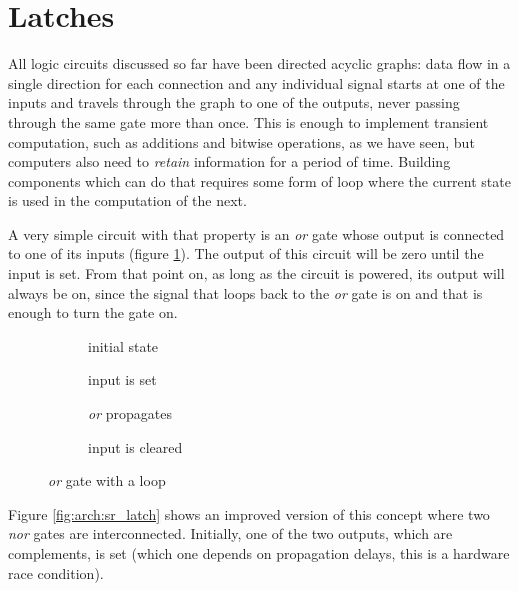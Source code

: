 \section{Latches}

All logic circuits discussed so far have been directed acyclic graphs: data flow
in a single direction for each connection and any individual signal starts at
one of the inputs and travels through the graph to one of the outputs, never
passing through the same gate more than once.  This is enough to implement
transient computation, such as additions and bitwise operations, as we have
seen, but computers also need to \emph{retain} information for a period of time.
Building components which can do that requires some form of loop where the
current state is used in the computation of the next.

A very simple circuit with that property is an \textit{or} gate whose output is
connected to one of its inputs (figure \ref{fig:arch:or_loop}).  The output of
this circuit will be zero until the input is set.  From that point on, as long
as the circuit is powered, its output will always be on, since the signal that
loops back to the \textit{or} gate is on and that is enough to turn the gate on.

\begin{figure}[p]
    \centering
    \begin{subfigure}{0.24\textwidth}
        
        \caption{initial state}
    \end{subfigure}
    \begin{subfigure}{0.24\textwidth}
        
        \caption{input is set}
    \end{subfigure}
    \begin{subfigure}{0.24\textwidth}
        
        \caption{\textit{or} propagates}
    \end{subfigure}
    \begin{subfigure}{0.24\textwidth}
        
        \caption{input is cleared}
    \end{subfigure}
    \caption{\textit{or} gate with a loop}
    \label{fig:arch:or_loop}
\end{figure}

Figure \ref{fig:arch:sr_latch} shows an improved version of this concept where
two \textit{nor} gates are interconnected.  Initially, one of the two outputs,
which are complements, is set (which one depends on propagation delays, this is
a hardware race condition).

